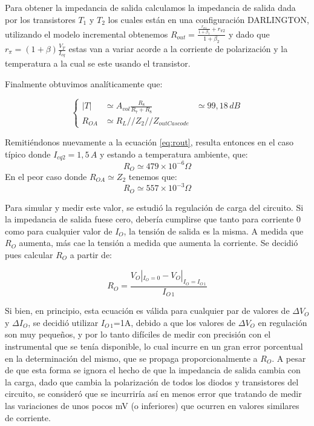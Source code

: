 \documentclass[e2_tp1_main.tex]{subfiles}
\begin{document}
Para obtener la impedancia de salida calculamos la impedancia de salida dada por los transistores $T_1$ y $T_2$ los cuales están en una configuración DARLINGTON, utilizando el modelo incremental obtenemos $R_{out}=\frac{\frac{r_{\pi1}}{1+\beta_1}+r_{\pi2}}{1+\beta_2}$ y dado que $r_{\pi}=(1+\beta)\frac{V_T}{I_{cq}}$ estas van a variar acorde a la corriente de polarización y la temperatura a la cual se este usando el transistor. 

Finalmente obtuvimos anal\'iticamente que:

\begin{equation}
	\left\{
	\begin{aligned}
	|T| &\simeq{}A_{vol}\frac{R_8}{R_7+R_8}&\simeq{}99,18\,dB\\
	R_{OA} &\simeq{}R_L//Z_2//Z_{outCascode}
	\end{aligned}
	\right.
\end{equation}

Remiti\'endonos nuevamente a la ecuaci\'on \ref{eq:rout}, resulta entonces en el caso típico donde $I_{cq2}=1,5\,A$ y estando a temperatura ambiente, que:
$$R_O \simeq 479\times 10^{-6}\Omega$$
En el peor caso donde $R_{OA}\simeq{}Z_2$ tenemos que:
$$R_O \simeq 557\times 10^{-3}\Omega$$

Para simular y medir este valor, se estudi\'o la regulaci\'on de carga del circuito. Si la impedancia de salida fuese cero, deber\'ia cumplirse que tanto para corriente 0 como para cualquier valor de $I_O$, la tensi\'on de salida es la misma. A medida que $R_O$ aumenta, m\'as cae la tensi\'on a medida que aumenta la corriente. Se decidi\'o pues calcular $R_O$ a partir de:

\begin{equation}
	R_O = \frac{V_O|_{I_O=0} - V_O|_{I_O=I_{O\,1}}}{I_{O\,1}}
\end{equation} 

Si bien, en principio, esta ecuaci\'on es v\'alida para cualquier par de valores de $\Delta V_O$ y $\Delta I_O$, se decidi\'o utilizar $I_{O\,1}$=1A, debido a que los valores de $\Delta V_O$ en regulaci\'on son muy peque\~nos, y por lo tanto dif\'iciles de medir con precisi\'on con el instrumental que se ten\'ia disponible, lo cual incurre en un gran error porcentual en la determinaci\'on del mismo, que se propaga proporcionalmente a $R_O$. A pesar de que esta forma se ignora el hecho de que la impedancia de salida cambia con la carga, dado que cambia la polarizaci\'on de todos los diodos y transistores del circuito, se consider\'o que se incurrir\'ia as\'i en menos error que tratando de medir las variaciones de unos pocos mV (o inferiores) que ocurren en valores similares de corriente.
\end{document}
